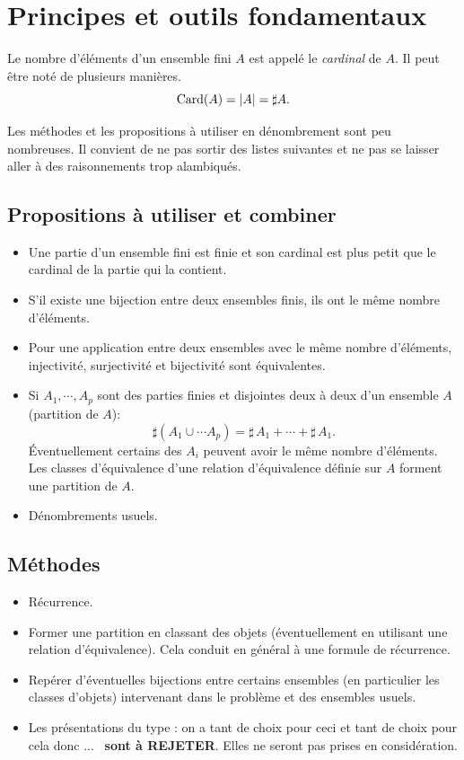
%

\section{Principes et outils fondamentaux}
\begin{nota}
 Le nombre d'éléments d'un ensemble fini $A$ est appelé le \emph{cardinal} de $A$. Il peut être noté de plusieurs manières.
\[
 \mathop{\mathrm{Card}}(A) = |A| = \sharp A.
\]
\end{nota}
Les méthodes et les propositions à utiliser en dénombrement sont peu nombreuses. Il convient de ne pas sortir des listes suivantes et ne pas se laisser aller à des raisonnements trop alambiqués.

\subsection{Propositions à utiliser et combiner}
\begin{itemize}
 \item Une partie d'un ensemble fini est finie et son cardinal est plus petit que le cardinal de la partie qui la contient.
 \item S'il existe une bijection entre deux ensembles finis, ils ont le même nombre d'éléments.
 \item Pour une application entre deux ensembles avec le même nombre d'éléments, injectivité, surjectivité et bijectivité sont équivalentes.
 \item Si $A_1,\cdots,A_p$ sont des parties finies et disjointes deux à deux d'un ensemble $A$ (partition de $A$):
\begin{displaymath}
 \sharp\left(A_1 \cup \cdots A_p \right) = \sharp\, A_1 + \cdots + \sharp\, A_1. 
\end{displaymath}
\'Eventuellement certains des $A_i$ peuvent avoir le même nombre d'éléments. Les classes d'équivalence d'une relation d'équivalence définie sur $A$ forment une partition de $A$.
\item Dénombrements usuels.
\end{itemize}

\subsection{Méthodes}
\begin{itemize}
 \item Récurrence.
 \item Former une partition en classant des objets (éventuellement en utilisant une relation d'équivalence). Cela conduit en général à une formule de récurrence.
 \item Repérer d'éventuelles bijections entre certains ensembles (en particulier les classes d'objets) intervenant dans le problème et des ensembles usuels.
 \item Les présentations du type : \og on a tant de choix pour ceci et tant de choix pour cela donc ...\fg~ \textbf{sont à REJETER}. Elles ne seront pas prises en considération.
\end{itemize}

